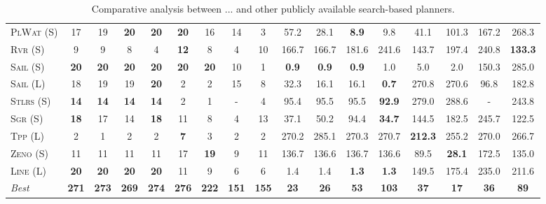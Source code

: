 \documentclass[11pt]{article}
\begin{document}
\begin{table}[tb]
{\begin{tabular}{|l||cccccccc||cccccccc||}
\textsc{PlWat} (S)&17&19&\textbf{20}&\textbf{20}&\textbf{20}&16&14&3&57.2&28.1&\textbf{8.9}&9.8&41.1&101.3&167.2&268.3\\
\textsc{Rvr} (S)&9&9&8&4&\textbf{12}&8&4&10&166.7&166.7&181.6&241.6&143.7&197.4&240.8&\textbf{133.3}\\
\textsc{Sail} (S)&\textbf{20}&\textbf{20}&\textbf{20}&\textbf{20}&\textbf{20}&\textbf{20}&10&1&\textbf{0.9}&\textbf{0.9}&\textbf{0.9}&1.0&5.0&2.0&150.3&285.0\\
\textsc{Sail} (L)&18&19&19&\textbf{20}&2&2&15&8&32.3&16.1&16.1&\textbf{0.7}&270.8&270.6&96.8&182.8\\
\textsc{Stlrs} (S)&\textbf{14}&\textbf{14}&\textbf{14}&\textbf{14}&2&1&-&4&95.4&95.5&95.5&\textbf{92.9}&279.0&288.6&-&243.8\\
\textsc{Sgr} (S)&\textbf{18}&17&14&\textbf{18}&11&8&4&13&37.1&50.2&94.4&\textbf{34.7}&144.5&182.5&245.7&122.5\\
\textsc{Tpp} (L)&2&1&2&2&\textbf{7}&3&2&2&270.2&285.1&270.3&270.7&\textbf{212.3}&255.2&270.0&266.7\\
\textsc{Zeno} (S)&11&11&11&11&17&\textbf{19}&9&11&136.7&136.6&136.7&136.6&89.5&\textbf{28.1}&172.5&135.0\\
\textsc{Line} (L)&\textbf{20}&\textbf{20}&\textbf{20}&\textbf{20}&11&9&6&6&1.4&1.4&\textbf{1.3}&\textbf{1.3}&149.5&175.4&235.0&211.6
\\\hline
\textit{Best}&\textbf{271}&\textbf{273}&\textbf{269}&\textbf{274}&\textbf{276}&\textbf{222}&\textbf{151}&\textbf{155}&\textbf{23}&\textbf{26}&\textbf{53}&\textbf{103}&\textbf{37}&\textbf{17}&\textbf{36}&\textbf{89}\\\hline

        \end{tabular}}
        \caption{Comparative analysis between ... and other publicly available search-based planners.}
        \label{tab:search}
        \end{table}
        
\end{document}

